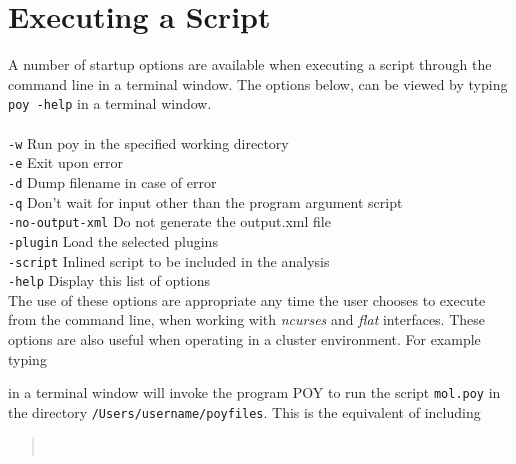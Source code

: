\section {Executing a Script}
\label {sec: ExecutingScript}
A number of startup options are available when executing a script through 
the command line in a terminal window. The options below, can be viewed 
by typing \texttt{poy -help} in a terminal window.\\
\\
\texttt{-w} \hspace{0.25 cm} Run poy in the specified working directory\\
\texttt{-e}  \hspace{0.25 cm} Exit upon error\\
\texttt{-d}  \hspace{0.25 cm} Dump filename in case of error\\
\texttt{-q}  \hspace{0.25 cm} Don't wait for input other than the program 
argument script\\
\texttt{-no-output-xml}  \hspace{0.25 cm} Do not generate the output.xml file\\
\texttt{-plugin}  \hspace{0.25 cm} Load the selected plugins\\
\texttt{-script}  \hspace{0.25 cm} Inlined script to be included in the analysis\\
\texttt{-help}  \hspace{0.25 cm} Display this list of options\\

The use of these options are appropriate any time the user chooses to execute 
\poy from the command line,  when working with \emph{ncurses} and 
\emph{flat} interfaces. These options are also useful when operating \poy 
in a cluster environment. For example typing

\begin{quote}
\end{quote}
in a terminal window will invoke the program POY to run the script 
\texttt{mol.poy} in the directory \texttt{/Users/username/poyfiles}.  
This is the equivalent of including

\begin{quote}
\\
\end{quote}

